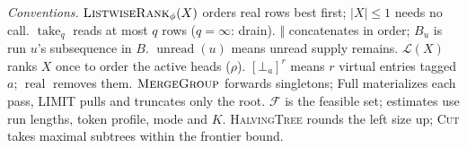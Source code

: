 \DontPrintSemicolon
\newcommand{\Rank}{\mbox{\textsc{ListwiseRank}}}
\newcommand{\Replay}{\mbox{\textsc{Replay}}}
\newcommand{\Refresh}{\mbox{\textsc{Refresh}}}
\newcommand{\MergeGroup}{\mbox{\textsc{MergeGroup}}}
\newcommand{\Expect}{\ensuremath{\mathrm{Expect}}}
\SetAlFnt{\footnotesize}
\SetAlCapFnt{\footnotesize}
\SetAlgoSkip{}
\SetAlgoInsideSkip{}
\makeatletter
\providecommand{\Needspace}[1]{}
\newsavebox{\algcolbox}
\newcommand{\algcolstart}{%
  \par
  \begin{lrbox}{\algcolbox}%
  \begin{minipage}[t]{\columnwidth}%
  \@twocolumnfalse
}
\newcommand{\algcolend}{%
  \end{minipage}%
  \end{lrbox}%
  \setbox\algcolbox=\hbox{\raise\dp\algcolbox\box\algcolbox}%
  \typeout{ALGBOX ht=\the\ht\algcolbox dp=\the\dp\algcolbox}%
  \Needspace{\dimexpr\ht\algcolbox+\dp\algcolbox+6pt\relax}%
  \noindent\usebox{\algcolbox}\par\smallskip
}
\makeatother

{\footnotesize\raggedright
\noindent\textit{Conventions.}
$\Rank_\phi(X)$ orders real rows best first; $|X|\le1$ needs no call.
$\operatorname{take}_q$ reads at most $q$ rows ($q=\infty$: drain).
$\Vert$ concatenates in order; $B_u$ is run $u$'s subsequence in $B$.
$\operatorname{unread}(u)$ means unread supply remains.
$\mathcal L(X)$ ranks $X$ once to order the active heads ($\rho$).
$[\bot_a]^r$ means $r$ virtual entries tagged $a$; $\operatorname{real}$ removes them.
$\MergeGroup$ forwards singletons; Full materializes each pass, LIMIT pulls and truncates only the root.
$\mathcal F$ is the feasible set; estimates use run lengths, token profile, mode and $K$.
\textsc{HalvingTree} rounds the left size up; \textsc{Cut} takes maximal subtrees within the frontier bound.\par}

